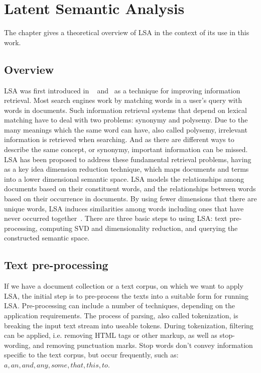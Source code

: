 \chapter{Latent Semantic Analysis}
\label{sec:lsa}

\begin{summary}
The chapter gives a theoretical overview of \gls{LSA} in the context of its use in this work.
\end{summary}
 
\section{Overview}
\label{sec:lsa:overview}

\gls{LSA} was first introduced in ~\cite{Dumais88usingLSA} and~\cite{Deerw90_LSA} as a technique for improving information retrieval. Most search engines work by matching words in a user's query with words in documents. Such information retrieval systems that depend on lexical matching have to deal with two problems: synonymy and polysemy. Due to the many meanings which the same word can have, also called polysemy, irrelevant information is retrieved when searching. And as there are different ways to describe the same concept, or synonymy, important information can be missed. \gls{LSA} has been proposed to address these fundamental retrieval problems, having as a key idea dimension reduction technique, which maps documents and terms into a lower dimensional semantic space. \gls{LSA} models the relationships among documents based on their constituent words, and the relationships between words based on their occurrence in documents. By using fewer dimensions that there are unique words, \gls{LSA} induces similarities among words including ones that have never occurred together~\cite{Dumais2006}. There are three basic steps to using \gls{LSA}: text pre-processing, computing \gls{SVD} and dimensionality reduction, and querying the constructed semantic space.\\
 
\section{Text pre-processing}
\label{sec:lsa:pre-processing}

If we have a document collection or a text corpus, on which we want to apply \gls{LSA}, the initial step is to pre-process the texts into a suitable form for running \gls{LSA}. Pre-processing can include a number of techniques, depending on the application requirements. The process of parsing, also called tokenization, is breaking the input text stream into useable tokens. During tokenization, filtering can be applied, i.e. removing HTML tags or other markup, as well as stop-wording, and removing punctuation marks. Stop words don't convey information specific to the text corpus, but occur frequently, such as: $ a, an, and, any, some, that, this, to $. \\

